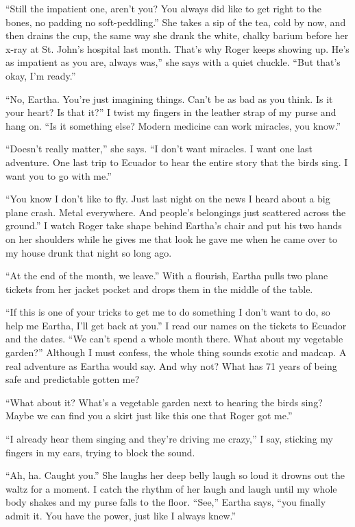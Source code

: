\documentclass[
]{article}
\begin{document}
``Still the impatient one, aren't you? You always did like to get right
to the bones, no padding no soft-peddling.'' She takes a sip of the tea,
cold by now, and then drains the cup, the same way she drank the white,
chalky barium before her x-ray at St. John's hospital last month. That's
why Roger keeps showing up. He's as impatient as you are, always was,''
she says with a quiet chuckle. ``But that's okay, I'm ready.''

``No, Eartha. You're just imagining things. Can't be as bad as you
think. Is it your heart? Is that it?'' I twist my fingers in the leather
strap of my purse and hang on. ``Is it something else? Modern medicine
can work miracles, you know.''

``Doesn't really matter,'' she says. ``I don't want miracles. I want one
last adventure. One last trip to Ecuador to hear the entire story that
the birds sing. I want you to go with me.''

``You know I don't like to fly. Just last night on the news I heard
about a big plane crash. Metal everywhere. And people's belongings just
scattered across the ground.'' I watch Roger take shape behind Eartha's
chair and put his two hands on her shoulders while he gives me that look
he gave me when he came over to my house drunk that night so long ago.

``At the end of the month, we leave.'' With a flourish, Eartha pulls two
plane tickets from her jacket pocket and drops them in the middle of the
table.

``If this is one of your tricks to get me to do something I don't want
to do, so help me Eartha, I'll get back at you.'' I read our names on
the tickets to Ecuador and the dates. ``We can't spend a whole month
there. What about my vegetable garden?'' Although I must confess, the
whole thing sounds exotic and madcap. A real adventure as Eartha would
say. And why not? What has 71 years of being safe and predictable gotten
me?

``What about it? What's a vegetable garden next to hearing the birds
sing? Maybe we can find you a skirt just like this one that Roger got
me.''

``I already hear them singing and they're driving me crazy,'' I say,
sticking my fingers in my ears, trying to block the sound.

``Ah, ha. Caught you.'' She laughs her deep belly laugh so loud it
drowns out the waltz for a moment. I catch the rhythm of her laugh and
laugh until my whole body shakes and my purse falls to the floor.
``See,'' Eartha says, ``you finally admit it. You have the power, just
like I always knew.''
\end{document}
